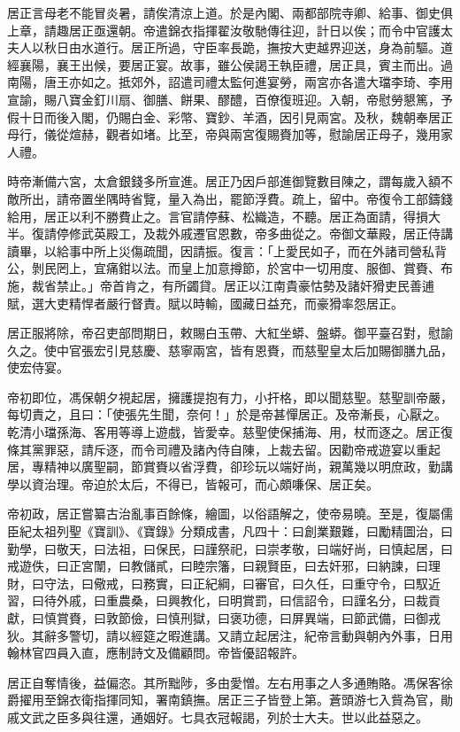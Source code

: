 \begin{pinyinscope}
居正言母老不能冒炎暑，請俟清涼上道。於是內閣、兩都部院寺卿、給事、御史俱上章，請趣居正亟還朝。帝遣錦衣指揮翟汝敬馳傳往迎，計日以俟；而令中官護太夫人以秋日由水道行。居正所過，守臣率長跪，撫按大吏越界迎送，身為前驅。道經襄陽，襄王出候，要居正宴。故事，雖公侯謁王執臣禮，居正具，賓主而出。過南陽，唐王亦如之。抵郊外，詔遣司禮太監何進宴勞，兩宮亦各遣大璫李琦、李用宣諭，賜八寶金釘川扇、御膳、餅果、醪醴，百僚復班迎。入朝，帝慰勞懇篤，予假十日而後入閣，仍賜白金、彩幣、寶鈔、羊酒，因引見兩宮。及秋，魏朝奉居正母行，儀從煊赫，觀者如堵。比至，帝與兩宮復賜賚加等，慰諭居正母子，幾用家人禮。

時帝漸備六宮，太倉銀錢多所宣進。居正乃因戶部進御覽數目陳之，謂每歲入額不敵所出，請帝置坐隅時省覽，量入為出，罷節浮費。疏上，留中。帝復令工部鑄錢給用，居正以利不勝費止之。言官請停蘇、松織造，不聽。居正為面請，得損大半。復請停修武英殿工，及裁外戚遷官恩數，帝多曲從之。帝御文華殿，居正侍講讀畢，以給事中所上災傷疏聞，因請振。復言：「上愛民如子，而在外諸司營私背公，剝民罔上，宜痛鉗以法。而皇上加意撙節，於宮中一切用度、服御、賞賚、布施，裁省禁止。」帝首肯之，有所蠲貸。居正以江南貴豪怙勢及諸奸猾吏民善逋賦，選大吏精悍者嚴行督責。賦以時輸，國藏日益充，而豪猾率怨居正。

居正服將除，帝召吏部問期日，敕賜白玉帶、大紅坐蟒、盤蟒。御平臺召對，慰諭久之。使中官張宏引見慈慶、慈寧兩宮，皆有恩賚，而慈聖皇太后加賜御膳九品，使宏侍宴。

帝初即位，馮保朝夕視起居，擁護提抱有力，小扞格，即以聞慈聖。慈聖訓帝嚴，每切責之，且曰：「使張先生聞，奈何！」於是帝甚憚居正。及帝漸長，心厭之。乾清小璫孫海、客用等導上遊戲，皆愛幸。慈聖使保捕海、用，杖而逐之。居正復條其黨罪惡，請斥逐，而令司禮及諸內侍自陳，上裁去留。因勸帝戒遊宴以重起居，專精神以廣聖嗣，節賞賚以省浮費，卻珍玩以端好尚，親萬幾以明庶政，勤講學以資治理。帝迫於太后，不得已，皆報可，而心頗嗛保、居正矣。

帝初政，居正嘗纂古治亂事百餘條，繪圖，以俗語解之，使帝易曉。至是，復屬儒臣紀太祖列聖《寶訓》、《寶錄》分類成書，凡四十：曰創業艱難，曰勵精圖治，曰勤學，曰敬天，曰法祖，曰保民，曰謹祭祀，曰崇孝敬，曰端好尚，曰慎起居，曰戒遊佚，曰正宮闈，曰教儲貳，曰睦宗籓，曰親賢臣，曰去奸邪，曰納諫，曰理財，曰守法，曰儆戒，曰務實，曰正紀綱，曰審官，曰久任，曰重守令，曰馭近習，曰待外戚，曰重農桑，曰興教化，曰明賞罰，曰信詔令，曰謹名分，曰裁貢獻，曰慎賞賚，曰敦節儉，曰慎刑獄，曰褒功德，曰屏異端，曰節武備，曰御戎狄。其辭多警切，請以經筵之暇進講。又請立起居注，紀帝言動與朝內外事，日用翰林官四員入直，應制詩文及備顧問。帝皆優詔報許。

居正自奪情後，益偏恣。其所黜陟，多由愛憎。左右用事之人多通賄賂。馮保客徐爵擢用至錦衣衛指揮同知，署南鎮撫。居正三子皆登上第。蒼頭游七入貲為官，勛戚文武之臣多與往還，通姻好。七具衣冠報謁，列於士大夫。世以此益惡之。


\end{pinyinscope}
